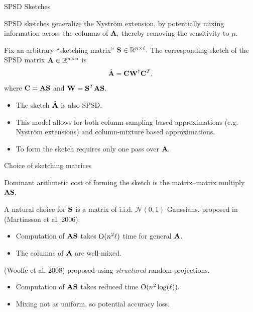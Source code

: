 \documentclass[xcolor=x11names,compress,ignorenonframetext,10pt]{beamer}
\renewcommand{\(}{\begin{columns}}
\renewcommand{\)}{\end{columns}}
\newcommand{\<}[1]{\begin{column}{#1}}
\renewcommand{\>}{\end{column}}
\def\refcolor{DodgerBlue4}
\newcommand{\refer}[1]{({\color{\refcolor}#1})}
\begin{document}
 
 \begin{frame}{SPSD Sketches}
 
 SPSD sketches generalize the Nystr\"om extension, by potentially mixing information across the columns of $\mathbf{A},$ 
 thereby removing the sensitivity to $\mu.$
 \vspace{0.7em}
 
 Fix an arbitrary ``sketching matrix'' $\mathbf{S} \in \mathbb{R}^{n \times \ell}.$ The corresponding sketch of the SPSD matrix $\mathbf{A} \in \mathbb{R}^{n \times n}$
 is
  \[
   \hat{\mathbf{A}} = \mathbf{C} \mathbf{W}^\dagger \mathbf{C}^T,
  \]
  where $\mathbf{C} = \mathbf{A}\mathbf{S}$ and $\mathbf{W} = \mathbf{S}^T \mathbf{A} \mathbf{S}.$
  
  \begin{itemize}
   \item The sketch $\hat{\mathbf{A}}$ is also SPSD.
   \item This model allows for both column-sampling based approximations (e.g. Nystr\"om extensions) and column-mixture
  based approximations. 
   \item To form the sketch requires only one pass over $\mathbf{A}.$
  \end{itemize}
  
\end{frame}
 
\begin{frame}{Choice of sketching matrices}

Dominant arithmetic cost of forming the sketch is the matrix--matrix multiply $\mathbf{A}\mathbf{S}.$
\vspace{1em}

A natural choice for $\mathbf{S}$ is a matrix of i.i.d. $\mathcal{N}(0,1)$ Gaussians, proposed in \refer{Martinsson et al. 2006}. 
\begin{itemize}
 \item Computation of 
$\mathbf{A} \mathbf{S}$ takes $\mathrm{O}(n^2\ell)$ time for general $\mathbf{A}$.
 \item The columns of $\mathbf{A}$ are well-mixed.
\end{itemize}

\vspace{1em}

\refer{Woolfe et al. 2008} proposed using \emph{structured} random projections.

\begin{itemize}
 \item Computation of $\mathbf{A} \mathbf{S}$ takes reduced time $\mathrm{O}(n^2 \log(\ell)).$
 \item Mixing not as uniform, so potential accuracy loss.
\end{itemize}

\end{frame}
\end{document}
